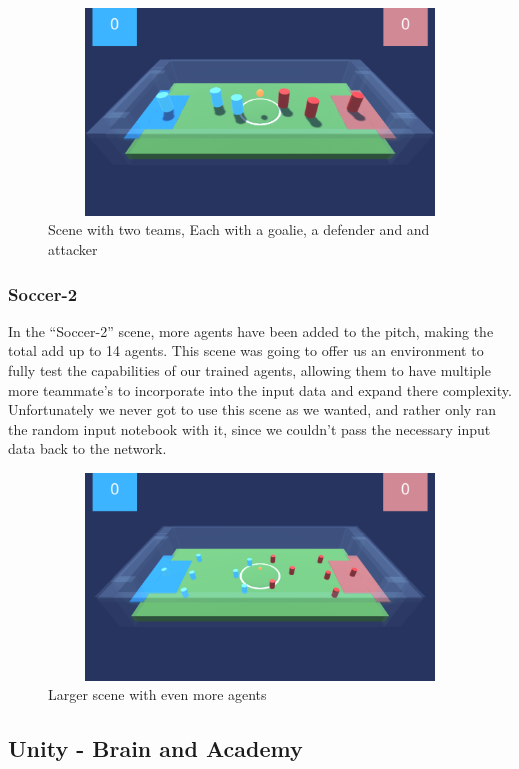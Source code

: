 \begin{figure}[H]
    \centering
    \includegraphics[width=115mm, height=55mm]{img/GameScreen1.png}
    \caption{Scene with two teams, Each with a goalie, a defender and and attacker}
    \label{fig:soc}
\end{figure}

\subsubsection{Soccer-2}
In the “Soccer-2” scene, more agents have been added to the pitch, making the total add up to 14 agents. This scene was going to offer us an environment to fully test the capabilities of our trained agents, allowing them to have multiple more teammate's to incorporate into the input data and expand there complexity. Unfortunately we never got to use this scene as we wanted, and rather only ran the random input notebook with it, since we couldn’t pass the necessary input data back to the network.

\begin{figure}[H]
    \centering
    \includegraphics[width=115mm, height=55mm]{img/GameScreen2.png}
    \caption{Larger scene with even more agents}
    \label{fig:soc2}
\end{figure}

%
\subsection{Unity - Brain and Academy}
